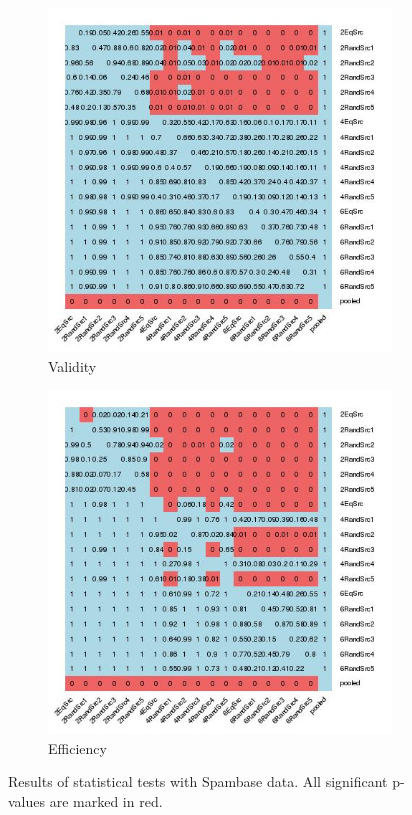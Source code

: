 \documentclass[main]{subfiles}
\begin{document}
\begin{figure}[!h]
\centering
\begin{subfigure}{.5\textwidth}
  \centering
  \includegraphics[width=\linewidth]{images/heatmapSpam}
  \caption{Validity}
  \label{fig:valSpam}
\end{subfigure}%
\begin{subfigure}{.5\textwidth}
  \centering
  \includegraphics[width=\linewidth]{images/heatmapSpam_eff}
  \caption{Efficiency}
  \label{fig:effSpam}
\end{subfigure}%
\caption{Results of statistical tests with Spambase data. All significant p-values are marked in red.}
\label{fig:testSpam}
\end{figure}
\end{document}

